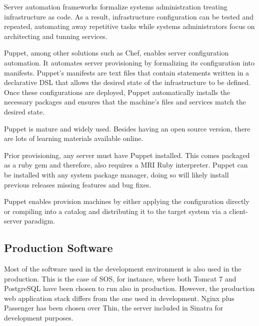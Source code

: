 Server automation frameworks formalize systems administration treating infrastructure as code. As a result, infrastructure configuration can be tested and repeated, automating away repetitive tasks while systems administrators focus on architecting and tunning services.

Puppet, among other solutions such as Chef, enables server configuration automation. It automates server provisioning by formalizing its configuration into manifests. Puppet's manifests are text files that contain statements written in a declarative DSL that allows the desired state of the infrastructure to be defined. Once these configurations are deployed, Puppet automatically installs the necessary packages and ensures that the machine’s files and services match the desired state.


Puppet is mature and widely used. Besides having an open source version, there are lots of learning materials available online.

Prior provisioning, any server must have Puppet installed. This comes packaged as a ruby gem and therefore, also requires a MRI Ruby interpreter. Puppet can be installed with any system package manager, doing so will likely install previous releases missing features and bug fixes.

Puppet enables provision machines by either applying the configuration directly or compiling into a catalog and distributing it to the target system via a client-server paradigm.

\subsection*{Production Software}

Most of the software used in the development environment is also used in the production. This is the case of SOS, for instance, where both Tomcat 7 and PostgreSQL have been chosen to run also in production. However, the production web application stack differs from the one used in development. Nginx plus Passenger has been chosen over Thin, the server included in Sinatra for development purposes.

